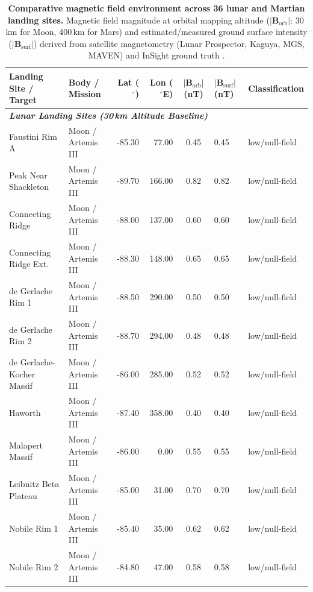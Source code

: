 \begin{table}[t]
\centering
\footnotesize
\caption{\textbf{Comparative magnetic field environment across 36 lunar and Martian landing sites.} Magnetic field magnitude at orbital mapping altitude ($|\mathbf{B}_{\text{orb}}|$: 30\,km for Moon, 400\,km for Mars) and estimated/measured ground surface intensity ($|\mathbf{B}_{\text{surf}}|$) derived from satellite magnetometry (Lunar Prospector, Kaguya, MGS, MAVEN) and InSight ground truth \citep{Hood2020, Hood2022, Langlais2019, Johnson2020}.}
\label{tab:comparative_landing_sites}
\begin{tabular}{llrrcll}
\toprule
\textbf{Landing Site / Target} & \textbf{Body / Mission} & \textbf{Lat ($^\circ$)} & \textbf{Lon ($^\circ$E)} & \textbf{$|\mathbf{B}_{\text{orb}}|$ (nT)} & \textbf{$|\mathbf{B}_{\text{surf}}|$ (nT)} & \textbf{Classification} \\
\midrule
\multicolumn{7}{l}{\textbf{\textit{Lunar Landing Sites (30\,km Altitude Baseline)}}} \\
Faustini Rim A & Moon / Artemis III & -85.30 & 77.00 & 0.45 & 0.45 & low/null-field \\
Peak Near Shackleton & Moon / Artemis III & -89.70 & 166.00 & 0.82 & 0.82 & low/null-field \\
Connecting Ridge & Moon / Artemis III & -88.00 & 137.00 & 0.60 & 0.60 & low/null-field \\
Connecting Ridge Ext. & Moon / Artemis III & -88.30 & 148.00 & 0.65 & 0.65 & low/null-field \\
de Gerlache Rim 1 & Moon / Artemis III & -88.50 & 290.00 & 0.50 & 0.50 & low/null-field \\
de Gerlache Rim 2 & Moon / Artemis III & -88.70 & 294.00 & 0.48 & 0.48 & low/null-field \\
de Gerlache-Kocher Massif & Moon / Artemis III & -86.00 & 285.00 & 0.52 & 0.52 & low/null-field \\
Haworth & Moon / Artemis III & -87.40 & 358.00 & 0.40 & 0.40 & low/null-field \\
Malapert Massif & Moon / Artemis III & -86.00 & 0.00 & 0.55 & 0.55 & low/null-field \\
Leibnitz Beta Plateau & Moon / Artemis III & -85.00 & 31.00 & 0.70 & 0.70 & low/null-field \\
Nobile Rim 1 & Moon / Artemis III & -85.40 & 35.00 & 0.62 & 0.62 & low/null-field \\
Nobile Rim 2 & Moon / Artemis III & -84.80 & 47.00 & 0.58 & 0.58 & low/null-field \\

\end{tabular}
\end{table}
